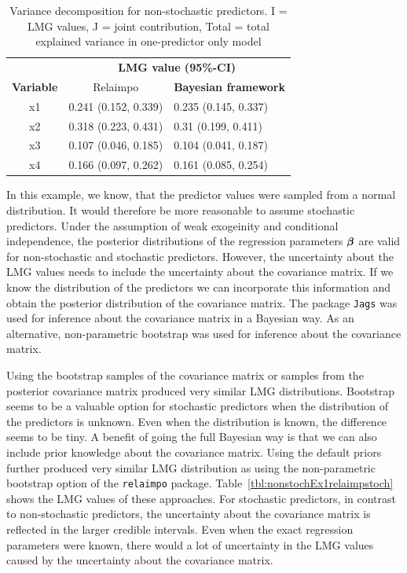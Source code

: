 \documentclass[11pt,a4paper,twoside]{book}
\begin{document}
\begin{table}[h]
\caption{Variance decomposition for non-stochastic predictors. I = LMG values, J = joint contribution, Total = total explained variance in one-predictor only model}
\centering
\begin{tabular}{cll}
   \toprule
   &\multicolumn{2}{c}{\textbf{LMG value (95\%-CI)}} \\
 \textbf{Variable} & \multicolumn{1}{c}{Relaimpo} & \textbf{Bayesian framework}  \\
  \hline
x1 & 0.241 (0.152, 0.339)  & 0.235 (0.145, 0.337)  \\ 
x2 & 0.318 (0.223, 0.431)  & 0.31 (0.199, 0.411)   \\ 
x3 & 0.107 (0.046, 0.185)  & 0.104 (0.041, 0.187)  \\ 
x4 & 0.166 (0.097, 0.262) & 0.161 (0.085, 0.254)  \\ 
   \bottomrule
\end{tabular}
\label{tbl:nonstochEx1relamip}
\end{table}

\FloatBarrier


In this example, we know, that the predictor values were sampled from a normal distribution. It would therefore be more reasonable to assume stochastic predictors. Under the assumption of weak exogeinity and conditional independence, the posterior distributions of the regression parameters ${\boldsymbol{\beta}}$ are valid for non-stochastic and stochastic predictors. However, the uncertainty about the LMG values needs to include the uncertainty about the covariance matrix. If we know the distribution of the predictors we can incorporate this information and obtain the posterior distribution of the covariance matrix. The package \texttt{Jags} was used for inference about the covariance matrix in a Bayesian way. As an alternative, non-parametric bootstrap was used for inference about the covariance matrix. 

Using the bootstrap samples of the covariance matrix or samples from the posterior covariance matrix produced  very similar LMG distributions. Bootstrap seems to be a valuable option for stochastic predictors when the distribution of the predictors is unknown. Even when the distribution is known, the difference seems to be tiny. A benefit of going the full Bayesian way is that we can also include prior knowledge about the covariance matrix. Using the default priors further produced very similar LMG distribution as using the non-parametric bootstrap option of the \texttt{relaimpo} package. Table~\ref{tbl:nonstochEx1relaimpstoch} shows the LMG values of these approaches. For stochastic predictors, in contrast to non-stochastic predictors, the uncertainty about the covariance matrix is reflected in the larger credible intervals. Even when the exact regression parameters were known, there would a lot of uncertainty in the LMG values caused by the uncertainty about the covariance matrix. 
\end{document}
